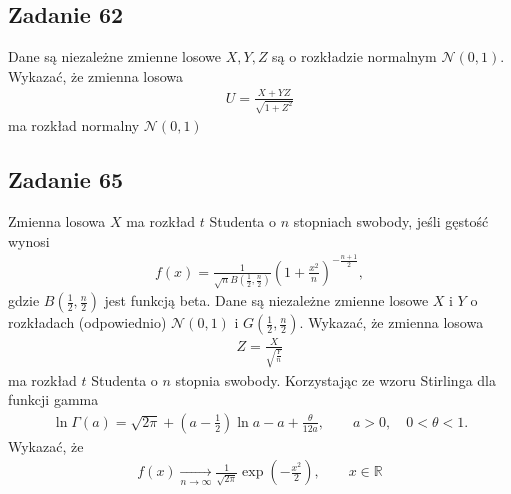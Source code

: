 \subsection*{Zadanie 62}
Dane są niezależne zmienne losowe $ X,Y,Z $ są o rozkładzie normalnym $ \mathcal N(0,1) $. Wykazać, że zmienna losowa
\begin{gather*}
U=\frac{X+YZ}{\sqrt{1+Z^2}}
\end{gather*}
ma rozkład normalny $ \mathcal N(0,1) $



\subsection*{Zadanie 65}
Zmienna losowa $ X $ ma rozkład $ t $ Studenta o $ n $ stopniach swobody, jeśli gęstość wynosi
\begin{gather*}
f(x)=\frac{1}{\sqrt nB \left(\frac{1}{2},\frac{n}{2}\right)}\left(1+\frac{x^2}{n}\right)^{-\frac{n+1}{2}},
\end{gather*}
gdzie $ B \left(\frac{1}{2},\frac{n}{2}\right) $ jest funkcją beta. Dane są niezależne zmienne losowe $ X $ i $ Y $ o rozkładach (odpowiednio) $ \mathcal N(0,1) $ i $ G\left(\frac{1}{2},\frac{n}{2}\right) $. Wykazać, że zmienna losowa
\begin{gather*}
Z=\frac{X}{\sqrt{\frac{Y}{n}}}
\end{gather*}
ma rozkład $ t$ Studenta o $ n $ stopnia swobody. Korzystając ze wzoru Stirlinga dla funkcji gamma
\begin{gather*}
\ln \Gamma(a)=\sqrt{2\pi}+\left(a-\frac{1}{2}\right)\ln a-a+\frac{\theta }{12a},\qquad
a>0,\quad 0<\theta<1.
\end{gather*}
Wykazać, że
\begin{gather*}
f(x)\xrightarrow[n\to \infty]{}\frac{1}{\sqrt{2\pi }}\exp \left(-\frac{x^2}{2}\right),\qquad x\in \mathbb R 
\end{gather*}


